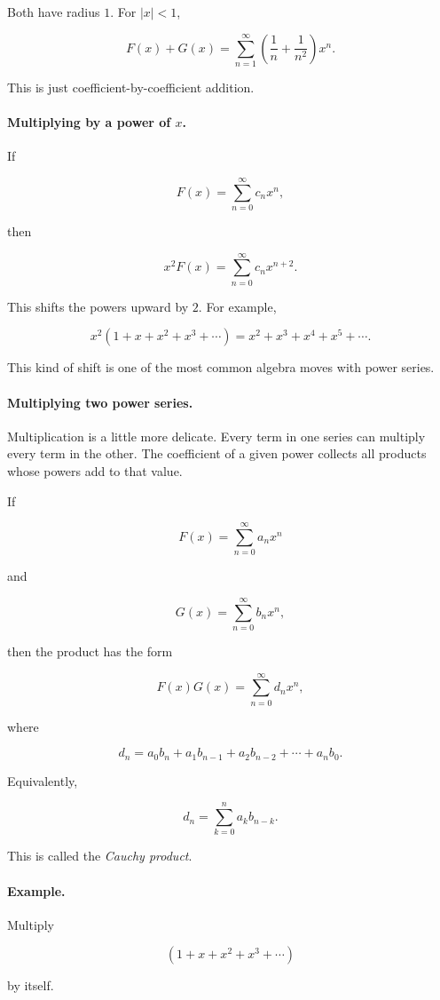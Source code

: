 Both have radius \(1\).  For \(|x|<1\),

\[
F(x)+G(x)
=
\sum_{n=1}^{\infty}\left(\frac1n+\frac1{n^2}\right)x^n.
\]

This is just coefficient-by-coefficient addition.

\paragraph{Multiplying by a power of \(x\).}
If

\[
F(x)=\sum_{n=0}^{\infty} c_nx^n,
\]

then

\[
x^2F(x)
=
\sum_{n=0}^{\infty} c_nx^{n+2}.
\]

This shifts the powers upward by \(2\).  For example,

\[
x^2(1+x+x^2+x^3+\cdots)
=
x^2+x^3+x^4+x^5+\cdots.
\]

This kind of shift is one of the most common algebra moves with power series.

\paragraph{Multiplying two power series.}
Multiplication is a little more delicate.  Every term in one series can multiply every
term in the other.  The coefficient of a given power collects all products whose powers
add to that value.

If

\[
F(x)=\sum_{n=0}^{\infty} a_nx^n
\]

and

\[
G(x)=\sum_{n=0}^{\infty} b_nx^n,
\]

then the product has the form

\[
F(x)G(x)
=
\sum_{n=0}^{\infty} d_nx^n,
\]

where

\[
\boxed{
d_n=a_0b_n+a_1b_{n-1}+a_2b_{n-2}+\cdots+a_nb_0.
}
\]

Equivalently,

\[
\boxed{
d_n=\sum_{k=0}^{n} a_k b_{n-k}.
}
\]

This is called the \emph{Cauchy product}.

\paragraph{Example.}
Multiply

\[
(1+x+x^2+x^3+\cdots)
\]

by itself.

